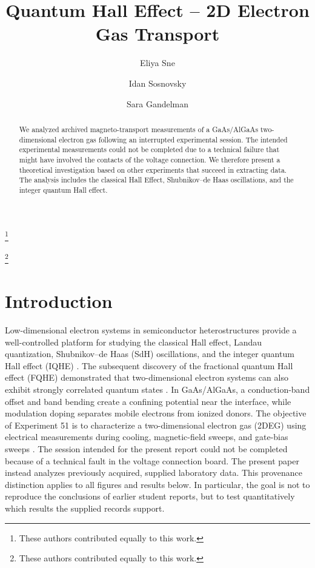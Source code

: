 \documentclass[
    aps,
    prb, 
    twocolumn, superscriptaddress,
    amsmath,
    amssymb,
    floatfix
]{revtex4-2}
\begin{document}
\title{Quantum Hall Effect -- 2D Electron Gas Transport}

\author{Eliya Sne}
\thanks{These authors contributed equally to this work.}

\author{Idan Sosnovsky}
\thanks{These authors contributed equally to this work.}

\author{Sara Gandelman}
\begin{abstract}
We analyzed archived magneto-transport measurements of a GaAs/AlGaAs two-dimensional electron gas following an interrupted experimental session. 
The intended experimental measurements could not be completed due to a technical failure that might have involved the contacts of the voltage connection. 
We therefore present a theoretical investigation based on other experiments that succeed in extracting data. 
The analysis includes the classical Hall Effect, Shubnikov--de Haas oscillations, and the integer quantum Hall effect.
\end{abstract}

\maketitle


\tableofcontents
\newpage




\section{Introduction}
\label{sec:introduction}
Low-dimensional electron systems in semiconductor heterostructures provide a well-controlled platform for studying the classical Hall effect, Landau quantization,
Shubnikov–de Haas (SdH) oscillations, and the integer quantum Hall effect (IQHE) \cite{weisbuch1991,chakraborty1995,klitzing1980}.
The subsequent discovery of the fractional quantum
Hall effect (FQHE) demonstrated that two-dimensional
electron systems can also exhibit strongly
correlated quantum states \cite{tsui1982}.
In GaAs/AlGaAs, a conduction-band offset and band bending create a confining potential near the interface, while modulation doping separates mobile electrons from ionized donors. The objective of Experiment 51 is to characterize a two-dimensional electron gas (2DEG) using electrical measurements during cooling, magnetic-field sweeps, and gate-bias sweeps
\cite{ando1982,weisbuch1991}.
The session intended for the present report could not be completed because of a technical
fault in the voltage connection board. The present paper instead analyzes previously acquired, supplied laboratory
data. This provenance distinction applies to all figures and results below. In particular, the goal is not to reproduce the conclusions of earlier student reports, but to test quantitatively which results the supplied records support.
\end{document}
